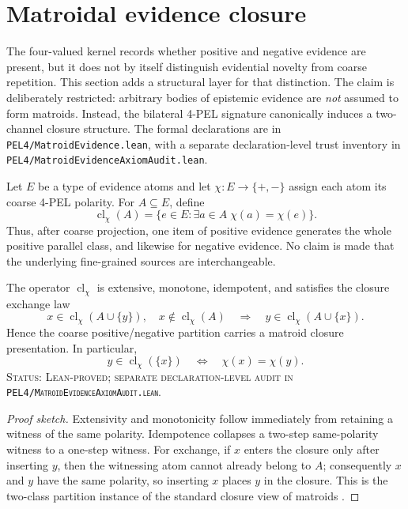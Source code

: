 \section{Matroidal evidence closure}
\label{sec:matroid-evidence}

The four-valued kernel records whether positive and negative evidence are
present, but it does not by itself distinguish evidential novelty from coarse
repetition. This section adds a structural layer for that distinction. The
claim is deliberately restricted: arbitrary bodies of epistemic evidence are
\emph{not} assumed to form matroids. Instead, the bilateral 4-PEL signature
canonically induces a two-channel closure structure. The formal declarations
are in \texttt{PEL4/MatroidEvidence.lean}, with a separate declaration-level
trust inventory in \texttt{PEL4/MatroidEvidenceAxiomAudit.lean}.

\begin{definition}
Let \(E\) be a type of evidence atoms and let
\(\chi:E\to\{+,-\}\) assign each atom its coarse 4-PEL polarity. For
\(A\subseteq E\), define
\[
  \operatorname{cl}_{\chi}(A)
  = \{e\in E : \exists a\in A\;\chi(a)=\chi(e)\}.
\]
Thus, after coarse projection, one item of positive evidence generates the
whole positive parallel class, and likewise for negative evidence. No claim is
made that the underlying fine-grained sources are interchangeable.
\end{definition}

\begin{theorem}
The operator \(\operatorname{cl}_{\chi}\) is extensive, monotone, idempotent,
and satisfies the closure exchange law
\[
 x\in \operatorname{cl}_{\chi}(A\cup\{y\}),\quad
 x\notin \operatorname{cl}_{\chi}(A)
 \quad\Longrightarrow\quad
 y\in \operatorname{cl}_{\chi}(A\cup\{x\}).
\]
Hence the coarse positive/negative partition carries a matroid closure
presentation. In particular,
\[
 y\in \operatorname{cl}_{\chi}(\{x\})
 \quad\Longleftrightarrow\quad
 \chi(x)=\chi(y).
\]
\textup{\textsc{Status: Lean-proved; separate declaration-level audit in
\texttt{PEL4/MatroidEvidenceAxiomAudit.lean}.}}
\end{theorem}
\begin{proof}[Proof sketch]
Extensivity and monotonicity follow immediately from retaining a witness of the
same polarity. Idempotence collapses a two-step same-polarity witness to a
one-step witness. For exchange, if \(x\) enters the closure only after inserting
\(y\), then the witnessing atom cannot already belong to \(A\); consequently
\(x\) and \(y\) have the same polarity, so inserting \(x\) places \(y\) in the
closure. This is the two-class partition instance of the standard closure
view of matroids \cite{Whitney1935,Oxley2011}.
\end{proof}


